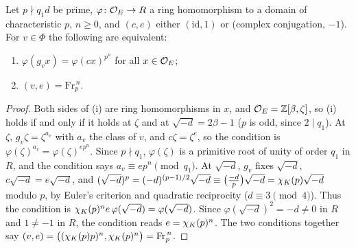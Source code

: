 \begin{lemma}\label{lem:frobenius-generators}
Let $p\nmid q_1d$ be prime, $\varphi\colon\mathcal{O}_E\to R$ a ring homomorphism to a domain of
characteristic $p$, $n\ge0$, and $(c,e)$ either $(\mathrm{id},1)$ or (complex conjugation, $-1$).
For $v\in\Phi$ the following are equivalent:
\begin{enumerate}[label=\textup{(\roman*)}]
\item $\varphi(g_v x)=\varphi(cx)^{p^n}$ for all $x\in\mathcal{O}_E$;
\item $(v,e)=\mathrm{Fr}_p^{\,n}$.
\end{enumerate}
\end{lemma}

\begin{proof}
Both sides of (i) are ring homomorphisms in $x$, and $\mathcal{O}_E=\mathbb{Z}[\beta,\zeta]$, so (i) holds if and
only if it holds at $\zeta$ and at $\sqrt{-d}=2\beta-1$ ($p$ is odd, since $2\mid q_1$). At $\zeta$,
$g_v\zeta=\zeta^{a_v}$ with $a_v$ the class of $v$, and $c\zeta=\zeta^e$, so the condition is
$\varphi(\zeta)^{a_v}=\varphi(\zeta)^{ep^n}$. Since $p\nmid q_1$, $\varphi(\zeta)$ is a primitive root
of unity of order $q_1$ in $R$, and the condition says $a_v\equiv ep^n\pmod{q_1}$. At $\sqrt{-d}$, $g_v$
fixes $\sqrt{-d}$, $c\sqrt{-d}=e\sqrt{-d}$, and
$(\sqrt{-d})^{p}=(-d)^{(p-1)/2}\sqrt{-d}\equiv\bigl(\tfrac{-d}p\bigr)\sqrt{-d}=\chi_K(p)\sqrt{-d}$ modulo
$p$, by Euler's criterion and quadratic reciprocity ($d\equiv3\pmod4$). Thus the condition is
$\chi_K(p)^ne\,\varphi(\sqrt{-d})=\varphi(\sqrt{-d})$. Since $\varphi(\sqrt{-d})^2=-d\ne0$ in $R$ and
$1\neq-1$ in $R$, the condition reads $e=\chi_K(p)^n$. The two conditions together say
$(v,e)=\bigl((\chi_K(p)p)^n,\chi_K(p)^n\bigr)=\mathrm{Fr}_p^{\,n}$.
\end{proof}

